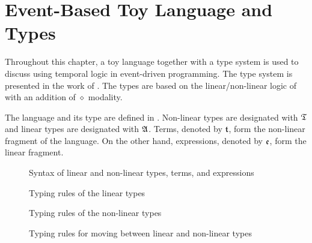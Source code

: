 \section{Event-Based Toy Language and Types}

Throughout this chapter, a toy language together with a type system is used to discuss using temporal logic in event-driven programming. The type system is presented in the work of \cite{Paykin2016TheEO}. The types are based on the linear/non-linear logic of \cite{DBLP:conf/csl/Benton94} with an addition of $\diamond$ modality.

The language and its type are defined in . Non-linear types are designated with $\mathfrak{T}$ and linear types are designated with $\mathfrak{A}$. Terms, denoted by $\mathfrak{t}$, form the non-linear fragment of the language. On the other hand, expressions, denoted by $\mathfrak{e}$, form the linear fragment.

\begin{figure}
    \centering
    
    \caption{Syntax of linear and non-linear types, terms, and expressions}
    \label{fig:syntax-of-types-terms-expressions}
\end{figure}

\begin{figure}
    \centering
    
    \caption{Typing rules of the linear types}
    \label{fig:typing-rules-for-linear-types}
\end{figure}

\begin{figure}
    \centering
    
    \caption{Typing rules of the non-linear types}
    \label{fig:typing-rules-for-nonlinear-types}
\end{figure}

\begin{figure}
    \centering
    
    \caption{Typing rules for moving between linear and non-linear types}
    \label{fig:typing-rules-for-linear-and-nonlinear-types}
\end{figure}

